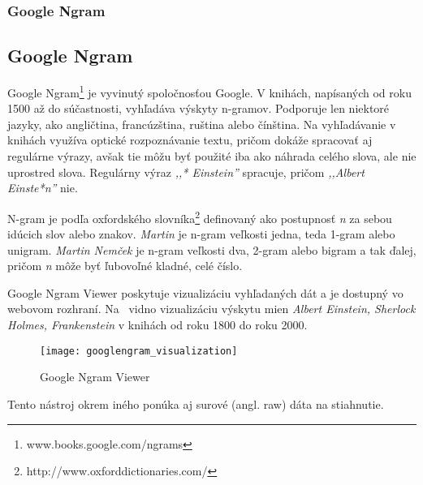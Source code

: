 %
%
{
	\subsubsection{Google Ngram}
}
{
	\subsection{Google Ngram}
}
\label{subsubsec:googlengram}
Google Ngram\footnote{www.books.google.com/ngrams} je vyvinutý spoločnosťou Google. V knihách, napísaných od roku 1500 až do súčastnosti, vyhľadáva výskyty n-gramov. Podporuje len niektoré jazyky, ako angličtina, francúzština, ruština alebo čínština. Na vyhľadávanie v knihách využíva optické rozpoznávanie textu, pričom dokáže spracovať aj regulárne výrazy, avšak tie môžu byť použité iba ako náhrada celého slova, ale nie uprostred slova. Regulárny výraz \textit{,,* Einstein''} spracuje, pričom \textit{,,Albert Einste*n''} nie.

N-gram je podľa oxfordského slovníka\footnote{http://www.oxforddictionaries.com/} definovaný ako postupnosť \textit{n} za sebou idúcich slov alebo znakov. \textit{Martin} je n-gram veľkosti jedna, teda 1-gram alebo unigram. \textit{Martin Nemček} je n-gram veľkosti dva, 2-gram alebo bigram a tak ďalej, pričom \textit{n} môže byť ľubovoľné kladné, celé číslo.

Google Ngram Viewer poskytuje vizualizáciu vyhľadaných dát a je dostupný vo webovom rozhraní. Na~ vidno vizualizáciu výskytu mien \textit{Albert Einstein, Sherlock Holmes, Frankenstein} v knihách od roku 1800 do roku 2000.

\begin{figure}[H]
\begin{center}\texttt{[image: googlengram\_visualization]}\end{center}
\caption[Google Ngram Viewer]{Google Ngram Viewer}\label{fig:googlengram_visualization}
\end{figure}

Tento nástroj okrem iného ponúka aj surové (angl. raw) dáta na stiahnutie.

